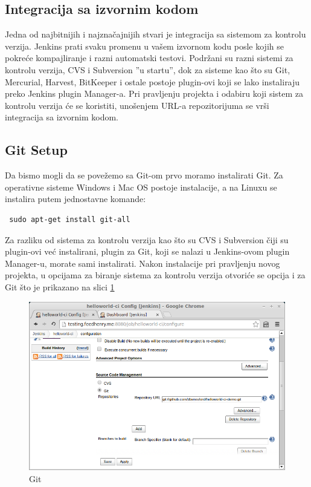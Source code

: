 \subsection{Integracija sa izvornim kodom}

Jedna od najbitnijih i najznačajnijih stvari je integracija sa sistemom za kontrolu verzija. Jenkins prati svaku promenu u vašem izvornom kodu posle kojih se pokreće kompajliranje i razni automatski testovi. Podržani su razni sistemi za kontrolu verzija, CVS i Subversion ''u startu'', dok za sisteme kao što su Git, Mercurial, Harvest, BitKeeper i ostale postoje plugin-ovi koji se lako instaliraju preko Jenkins plugin Manager-a. Pri pravljenju projekta i odabiru koji sistem za kontrolu verzija će se koristiti, unošenjem URL-a repozitorijuma se vrši integracija sa izvornim kodom.

\subsection{Git Setup}

Da bismo mogli da se povežemo sa Git-om prvo moramo instalirati Git. Za operativne sisteme Windows i Mac OS postoje instalacije, a na Linuxu se instalira putem jednostavne komande:

\begin{verbatim}
 sudo apt-get install git-all
\end{verbatim}

Za razliku od sistema za kontrolu verzija kao što su CVS i Subversion čiji su plugin-ovi već instalirani, plugin za Git, koji se nalazi u Jenkins-ovom plugin Manager-u, morate sami instalirati. Nakon instalacije pri pravljenju novog projekta, u opcijama za biranje sistema za kontrolu verzija otvoriće se opcija i za Git što je prikazano na slici \ref{fig:git}

\begin{figure}[h!]
\begin{center}
\includegraphics[scale=0.75, totalheight=0.4\textheight]{slike/git_jenkins.jpg}
\end{center}
\caption{Git}
\label{fig:git}
\end{figure}

